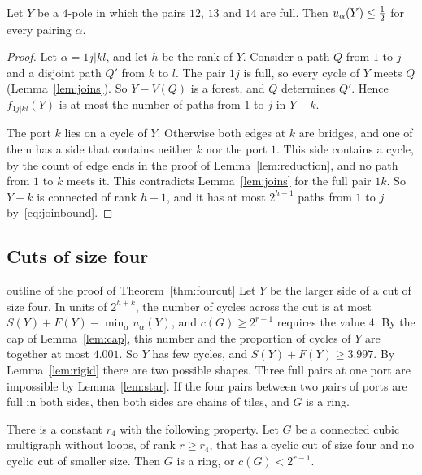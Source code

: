 \begin{lemma}\label{lem:star}
Let $Y$ be a $4$-pole in which the pairs $12$, $13$ and $14$ are full. Then
$u_\alpha(Y)\le\tfrac12$ for every pairing $\alpha$.
\end{lemma}

\begin{proof}
Let $\alpha=1j|kl$, and let $h$ be the rank of $Y$. Consider a path $Q$ from $1$ to $j$ and a
disjoint path $Q'$ from $k$ to $l$. The pair $1j$ is full, so every cycle of $Y$ meets $Q$
(Lemma~\ref{lem:joins}). So $Y-V(Q)$ is a forest, and $Q$ determines $Q'$. Hence $f_{1j|kl}(Y)$
is at most the number of paths from $1$ to $j$ in $Y-k$.

The port $k$ lies on a cycle of $Y$. Otherwise both edges at $k$ are bridges, and one of them
has a side that contains neither $k$ nor the port $1$. This side contains a cycle, by the count
of edge ends in the proof of Lemma~\ref{lem:reduction}, and no path from $1$ to $k$ meets it.
This contradicts Lemma~\ref{lem:joins} for the full pair $1k$. So $Y-k$ is connected of rank
$h-1$, and it has at most $2^{h-1}$ paths from $1$ to $j$ by~\eqref{eq:joinbound}.
\end{proof}

\subsection{Cuts of size four}

\begin{idea}{outline of the proof of Theorem~\ref{thm:fourcut}}
Let $Y$ be the larger side of a cut of size four. In units of $2^{h+k}$, the number of cycles
across the cut is at most $S(Y)+F(Y)-\min_\alpha u_\alpha(Y)$, and $c(G)\ge2^{r-1}$ requires the
value $4$. By the cap of Lemma~\ref{lem:cap}, this number and the proportion of cycles of $Y$ are
together at most $4.001$. So $Y$ has few cycles, and $S(Y)+F(Y)\ge3.997$. By
Lemma~\ref{lem:rigid} there are two possible shapes. Three full pairs at one port are impossible
by Lemma~\ref{lem:star}. If the four pairs between two pairs of ports are full in both sides,
then both sides are chains of tiles, and $G$ is a ring.
\end{idea}

\begin{theorem}\label{thm:fourcut}
There is a constant $r_4$ with the following property. Let $G$ be a connected cubic multigraph
without loops, of rank $r\ge r_4$, that has a cyclic cut of size four and no cyclic cut of
smaller size. Then $G$ is a ring, or $c(G)<2^{r-1}$.
\end{theorem}

